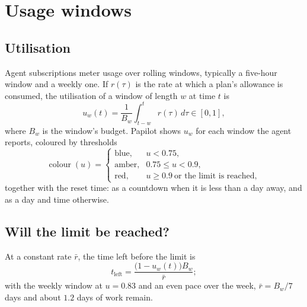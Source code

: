 \section{Usage windows}
\label{sec:usage}

\subsection{Utilisation}

Agent subscriptions meter usage over rolling windows, typically a five-hour
window and a weekly one. If $r(\tau)$ is the rate at which a plan's allowance
is consumed, the utilisation of a window of length $w$ at time $t$ is
\begin{equation}
  u_w(t) = \frac{1}{B_w} \int_{t-w}^{t} r(\tau)\, d\tau \in [0, 1],
  \label{eq:utilisation}
\end{equation}
where $B_w$ is the window's budget. Papilot shows $u_w$ for each window the
agent reports, coloured by thresholds
\begin{equation}
  \operatorname{colour}(u) =
  \begin{cases}
    \text{blue}, & u < 0.75,\\
    \text{amber}, & 0.75 \le u < 0.9,\\
    \text{red}, & u \ge 0.9 \ \text{or the limit is reached},
  \end{cases}
\end{equation}
together with the reset time: as a countdown when it is less than a day away,
and as a day and time otherwise.

\subsection{Will the limit be reached?}

At a constant rate $\bar r$, the time left before the limit is
\begin{equation}
  t_{\text{left}} = \frac{\bigl(1 - u_w(t)\bigr) B_w}{\bar r} ;
\end{equation}
with the weekly window at $u = 0.83$ and an even pace over the week,
$\bar r = B_w / 7$\,days and about $1.2$ days of work remain.

